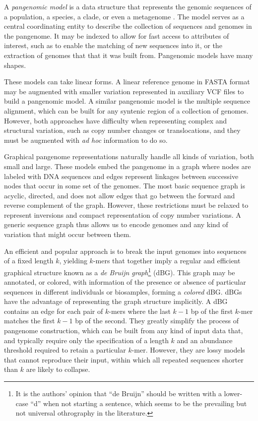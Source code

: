 A \emph{pangenomic model} is a data structure that represents the genomic sequences of a population, a species, a clade, or even a metagenome \cite{computational2016computational}.
The model serves as a central coordinating entity to describe the collection of sequences and genomes in the pangenome.
It may be indexed to allow for fast access to attributes of interest, such as to enable the matching of new sequences into it, or the extraction of genomes that that it was built from.
Pangenomic models have many shapes.

These models can take linear forms.
A linear reference genome in FASTA format may be augmented with smaller variation represented in auxiliary VCF files to build a pangenomic model.
A similar pangenomic model is the multiple sequence alignment, which can be built for any syntenic region of a collection of genomes.
However, both approaches have difficulty when representing complex and structural variation, such as copy number changes or translocations, and they must be augmented with \textit{ad hoc} information to do so.

Graphical pangenome representations naturally handle all kinds of variation, both small and large.
These models embed the pangenome in a graph where nodes are labeled with DNA sequences and edges represent linkages between successive nodes that occur in some set of the genomes.
The most basic sequence graph is acyclic, directed, and does not allow edges that go between the forward and reverse complement of the graph.
However, these restrictions must be relaxed to represent inversions and compact representation of copy number variations.
A generic sequence graph thus allows us to encode genomes and any kind of variation that might occur between them.

An efficient and popular approach is to break the input genomes into sequences of a fixed length $k$, yielding $k$-mers that together imply a regular and efficient graphical structure known as a \emph{de Bruijn graph}\footnote{It is the authors' opinion that ``de Bruijn'' should be written with a lower-case ``d'' when not starting a sentence, which seems to be the prevailing but not universal othrography in the literature.} (dBG).
This graph may be annotated, or colored, with information of the presence or absence of particular sequences in different individuals or biosamples, forming a \emph{colored} dBG.
dBGs have the advantage of representing the graph structure implicitly.
A dBG contains an edge for each pair of $k$-mers where the last $k-1$ bp of the first $k$-mer matches the first $k-1$ bp of the second.
They greatly simplify the process of pangenome construction, which can be built from any kind of input data that, and typically require only the specification of a length $k$ and an abundance threshold required to retain a particular $k$-mer.
However, they are lossy models that cannot reproduce their input, within which all repeated sequences shorter than $k$ are likely to collapse.

